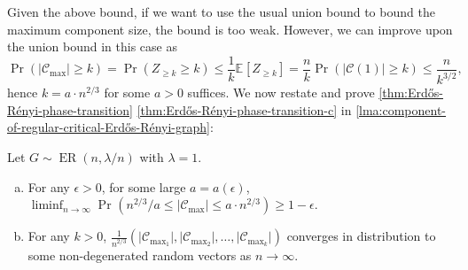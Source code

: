 Given the above bound, if we want to use the usual union bound to bound the maximum component size, the bound is too weak. However, we can improve upon the union bound in this case as
\[
	\Pr_{}(\lvert \mathcal{C} _{\max } \rvert \geq k)
	= \Pr_{}(Z_{\geq k} \geq k)
	\leq \frac{1}{k} \mathbb{E}_{}[Z_{\geq k}]
	= \frac{n}{k} \Pr_{}(\lvert \mathcal{C} (1) \rvert \geq k)
	\leq \frac{n}{k^{3 / 2}},
\]
hence \(k = a \cdot n^{2 / 3}\) for some \(a > 0\) suffices. We now restate and prove \autoref{thm:Erdős-Rényi-phase-transition} \autoref{thm:Erdős-Rényi-phase-transition-c} in \autoref{lma:component-of-regular-critical-Erdős-Rényi-graph}:

\begin{lemma}\label{lma:component-of-regular-critical-Erdős-Rényi-graph}
	Let \(G \sim \operatorname{ER}(n, \lambda / n) \) with \(\lambda = 1\).
	\begin{enumerate}[(a)]
		\item\label{lma:component-of-regular-critical-Erdős-Rényi-graph-a} For any \(\epsilon > 0\), for some large \(a = a(\epsilon )\), \(\liminf_{n \to \infty} \Pr_{}\left( n^{2 / 3} / a \leq \lvert \mathcal{C} _{\max } \rvert \leq a \cdot n^{2 / 3} \right) \geq 1 - \epsilon\).
		\item\label{lma:component-of-regular-critical-Erdős-Rényi-graph-b} For any \(k>0\), \(\frac{1}{n^{2 / 3}} (\lvert \mathcal{C} _{\max _1} \rvert , \lvert \mathcal{C} _{\max _2} \rvert , \dots , \lvert \mathcal{C} _{\max _k} \rvert ) \) converges in distribution to some non-degenerated random vectors as \(n \to \infty \).
	\end{enumerate}
\end{lemma}
